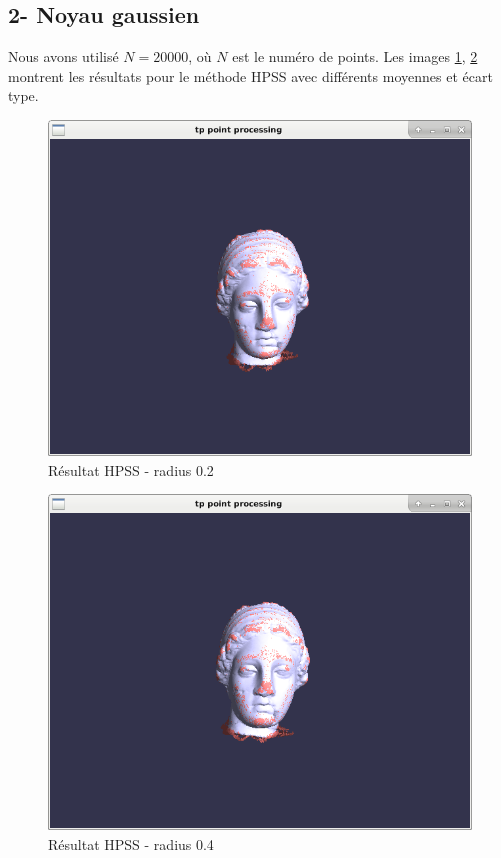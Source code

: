 \documentclass[a4,12pt]{report}
\begin{document}
\subsection*{2- Noyau gaussien}

Nous avons utilisé $N=20000$, où $N$ est le numéro de points. Les images \ref{fig:4}, \ref{fig:5} montrent les résultats pour le méthode HPSS avec différents moyennes et écart type.

\begin{figure}[!h]
	\includegraphics[width=\linewidth]{figs/gaussian_sem_bruit_0_1.png}
	\caption{Résultat HPSS - radius 0.2}
	\label{fig:4}
\end{figure}
\begin{figure}[!h]
	\includegraphics[width=\linewidth]{figs/gaussian_sem_bruit_0_5.png}
	\caption{Résultat HPSS - radius 0.4}
	\label{fig:5}
\end{figure}
\end{document}
